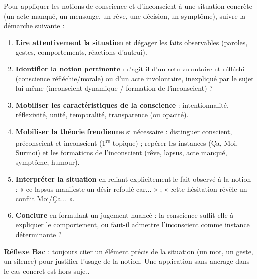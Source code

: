 \documentclass[11pt]{article}
\newcommand{\cle}[1]{{\popxbold\color{popdark}#1}}
\begin{document}
\begin{methode}
Pour appliquer les notions de \cle{conscience} et d'\cle{inconscient} à une situation concrète (un acte manqué, un mensonge, un rêve, une décision, un symptôme), suivre la démarche suivante :
\begin{enumerate}
\item \textbf{Lire attentivement la situation} et dégager les faits observables (paroles, gestes, comportements, réactions d'autrui).
\item \textbf{Identifier la notion pertinente} : s'agit-il d'un acte volontaire et réfléchi (conscience réfléchie/morale) ou d'un acte involontaire, inexpliqué par le sujet lui-même (inconscient dynamique / formation de l'inconscient) ?
\item \textbf{Mobiliser les caractéristiques de la conscience} : intentionnalité, réflexivité, unité, temporalité, transparence (ou opacité).
\item \textbf{Mobiliser la théorie freudienne} si nécessaire : distinguer \cle{conscient}, \cle{préconscient} et \cle{inconscient} (1\textsuperscript{re} topique) ; repérer les instances (Ça, Moi, Surmoi) et les formations de l'inconscient (rêve, lapsus, acte manqué, symptôme, humour).
\item \textbf{Interpréter la situation} en reliant explicitement le fait observé à la notion : « ce lapsus manifeste un désir refoulé car... » ; « cette hésitation révèle un conflit Moi/Ça... ».
\item \textbf{Conclure} en formulant un jugement nuancé : la conscience suffit-elle à expliquer le comportement, ou faut-il admettre l'inconscient comme instance déterminante ?
\end{enumerate}
\textbf{Réflexe Bac} : toujours citer un élément précis de la situation (un mot, un geste, un silence) pour justifier l'usage de la notion. Une application sans ancrage dans le cas concret est hors sujet.
\end{methode}
\end{document}

